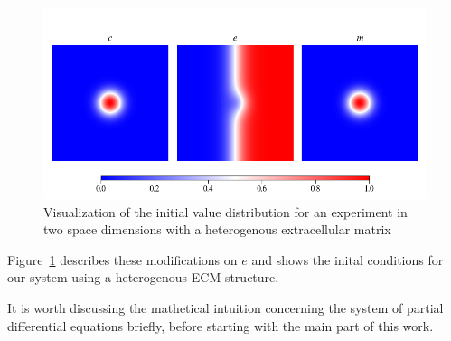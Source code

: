 \begin{figure}[h]
    \centering
    \label{fig:Initial_Value_Distribution}
    \includegraphics[width=\textwidth]{resources/images/2D_initial_conditions_heterogenous_ECM.png}
    \caption{Visualization of the initial value distribution for an experiment in two space dimensions with a heterogenous extracellular matrix}
    \label{fig:2D_heterogenous_ECM_initial}
\end{figure}
Figure~\ref{fig:2D_heterogenous_ECM_initial} describes these modifications on $e$ and shows the inital conditions for our system using a heterogenous ECM structure.
  
It is worth discussing the mathetical intuition concerning the system of partial differential equations briefly, before starting with the main part of this work. 

